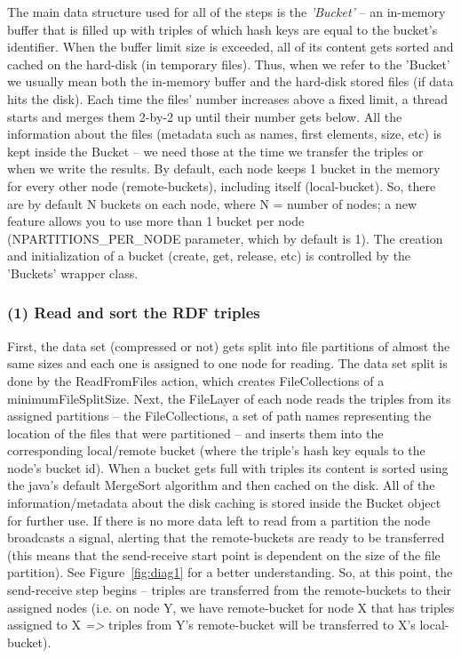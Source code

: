 The main data structure used for all of the steps is the \textit{'Bucket'} -- an in-memory buffer that is filled up with triples of which hash keys are equal to the bucket's identifier. When the buffer limit size is exceeded, all of its content gets sorted and cached on the hard-disk (in temporary files). Thus, when we refer to the 'Bucket' we usually mean both the in-memory buffer and the hard-disk stored files (if data hits the disk). Each time the files' number increases above a fixed limit, a thread starts and merges them 2-by-2 up until their number gets below. All the information about the files (metadata such as names, first elements, size, etc) is kept inside the Bucket -- we need those at the time we transfer the triples or when we write the results. By default, each node keeps 1 bucket in the memory for every other node (remote-buckets), including itself (local-bucket). So, there are by default N buckets on each node, where N = number of nodes; a new feature allows you to use more than 1 bucket per node (NPARTITIONS\_PER\_NODE parameter, which by default is 1). The creation and initialization of a bucket (create, get, release, etc) is controlled by the 'Buckets' wrapper class.

% 
\subsubsection*{(1) Read and sort the RDF triples}

First, the data set (compressed or not) gets split into file partitions of almost the same sizes and each one is assigned to one node for reading. The data set split is done by the ReadFromFiles action, which creates FileCollections of a minimumFileSplitSize. Next, the FileLayer of each node reads the triples from its assigned partitions -- the FileCollections, a set of path names representing the location of the files that were partitioned -- and inserts them into the corresponding local/remote bucket (where the triple's hash key equals to the node's bucket id). When a bucket gets full with triples its content is sorted using the java's default MergeSort algorithm and then cached on the disk. All of the information/metadata about the disk caching is stored inside the Bucket object for further use. If there is no more data left to read from a partition the node broadcasts a signal, alerting that the remote-buckets are ready to be transferred (this means that the send-receive start point is dependent on the size of the file partition). See Figure~\ref{fig:diag1} for a better understanding. So, at this point, the send-receive step begins -- triples are transferred from the remote-buckets to their assigned nodes (i.e. on node Y, we have remote-bucket for node X that has triples assigned to X \textit{=>} triples from Y's remote-bucket will be transferred to X's local-bucket).

